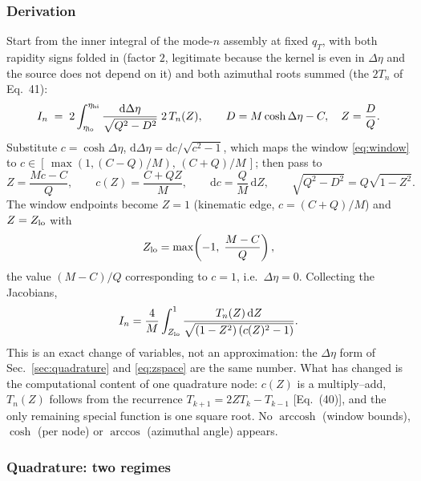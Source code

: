 \documentclass[11pt]{article}
\begin{document}
\subsubsection{Derivation}

Start from the inner integral of the mode-$n$ assembly at fixed $q_T$,
with both rapidity signs folded in (factor $2$, legitimate because the
kernel is even in $\Delta\eta$ and the source does not depend on it) and
both azimuthal roots summed (the $2T_n$ of Eq.~41):
\begin{equation}
I_n \;=\; 2\int_{\eta_{\rm lo}}^{\eta_{\rm hi}}
\frac{\mathrm{d}\Delta\eta}{\sqrt{Q^{2}-D^{2}}}\; 2\,T_n(Z),
\qquad D=M\cosh\Delta\eta-C,\quad Z=\frac{D}{Q}.
\end{equation}
Substitute $c=\cosh\Delta\eta$, $\mathrm{d}\Delta\eta=
\mathrm{d}c/\sqrt{c^{2}-1}$, which maps the window \eqref{eq:window} to
$c\in[\,\max(1,(C-Q)/M),\,(C+Q)/M\,]$; then pass to
\begin{equation}
Z=\frac{Mc-C}{Q},
\qquad
c(Z)=\frac{C+QZ}{M},
\qquad
\mathrm{d}c=\frac{Q}{M}\,\mathrm{d}Z,
\qquad
\sqrt{Q^{2}-D^{2}}=Q\sqrt{1-Z^{2}} .
\end{equation}
The window endpoints become $Z=1$ (kinematic edge, $c=(C+Q)/M$) and
$Z=Z_{\rm lo}$ with
\begin{equation}
Z_{\rm lo}=\max\!\left(-1,\;\frac{M-C}{Q}\right),
\end{equation}
the value $(M-C)/Q$ corresponding to $c=1$, i.e.\ $\Delta\eta=0$.
Collecting the Jacobians,
\begin{equation}
I_n=\frac{4}{M}\int_{Z_{\rm lo}}^{1}
\frac{T_n(Z)\,\mathrm{d}Z}
{\sqrt{\left(1-Z^{2}\right)\left(c(Z)^{2}-1\right)}} .
\label{eq:zspace}
\end{equation}
This is an exact change of variables, not an approximation: the $\Delta\eta$
form of Sec.~\ref{sec:quadrature} and \eqref{eq:zspace} are the same
number.  What has changed is the computational content of one quadrature
node: $c(Z)$ is a multiply--add, $T_n(Z)$ follows from the recurrence
$T_{k+1}=2ZT_k-T_{k-1}$ [Eq.~(40)], and the only remaining special
function is one square root.  No $\operatorname{arccosh}$ (window bounds),
$\cosh$ (per node) or $\arccos$ (azimuthal angle) appears.

\subsubsection{Quadrature: two regimes}
\end{document}
